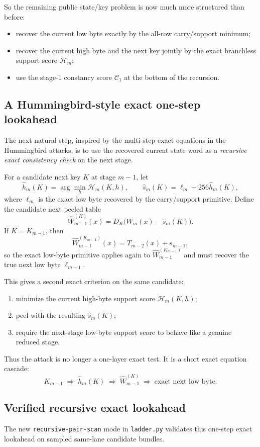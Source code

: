 \documentclass[11pt]{article}
\begin{document}
So the remaining public state/key problem is now much more structured than before:
\begin{itemize}
\item recover the current low byte exactly by the all-row carry/support minimum;
\item recover the current high byte and the next key jointly by the exact branchless support score $\mathcal{H}_m$;
\item use the stage-$1$ constancy score $\mathcal{C}_1$ at the bottom of the recursion.
\end{itemize}

\subsection*{A Hummingbird-style exact one-step lookahead}
The next natural step, inspired by the multi-step exact equations in the Hummingbird attacks, is to use the recovered current state word as a \emph{recursive exact consistency check} on the next stage.

For a candidate next key $K$ at stage $m-1$, let
\[
\widehat{h}_m(K)=\arg\min_h \mathcal{H}_m(K,h),
\qquad
\widehat{s}_m(K)=\ell_m + 256\widehat{h}_m(K),
\]
where $\ell_m$ is the exact low byte recovered by the carry/support primitive. Define the candidate next peeled table
\[
\widehat{W}_{m-1}^{(K)}(x)=D_K\!\bigl(W_m(x)-\widehat{s}_m(K)\bigr).
\]
If $K=K_{m-1}$, then
\[
\widehat{W}_{m-1}^{(K_{m-1})}(x)=T_{m-2}(x)+s_{m-1},
\]
so the exact low-byte primitive applies again to $\widehat{W}_{m-1}^{(K_{m-1})}$ and must recover the true next low byte $\ell_{m-1}$.

This gives a second exact criterion on the same candidate:
\begin{enumerate}[label=(\roman*)]
\item minimize the current high-byte support score $\mathcal{H}_m(K,h)$;
\item peel with the resulting $\widehat{s}_m(K)$;
\item require the next-stage low-byte support score to behave like a genuine reduced stage.
\end{enumerate}

Thus the attack is no longer a one-layer exact test. It is a short exact equation cascade:
\[
K_{m-1}\;\Longrightarrow\;\widehat{h}_m(K)\;\Longrightarrow\;\widehat{W}_{m-1}^{(K)}
\;\Longrightarrow\;\text{exact next low byte}.
\]

\subsection*{Verified recursive exact lookahead}
The new \texttt{recursive-pair-scan} mode in \texttt{ladder.py} validates this one-step exact lookahead on sampled same-lane candidate bundles.
\end{document}
